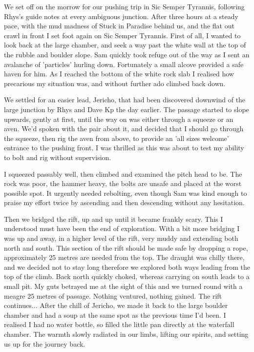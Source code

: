 We set off on the morrow for our pushing trip in Sic Semper Tyrannis, following Rhys's guide notes at every ambiguous junction. After three hours at a steady pace, with the mud madness of Stuck in Paradise behind us, and the flat out crawl in front I set foot again on Sic Semper Tyrannis.
First of all, I wanted to look back at the large chamber, and seek a way past the white wall at the top of the rubble and boulder slope. Sam quickly took refuge out of the way as I sent an avalanche of 'particles' hurling down. Fortunately a small alcove provided a safe haven for him. As I reached the bottom of the white rock slab I realised how precarious my situation was, and without further ado climbed back down.

We settled for an easier lead, Jericho, that had been discovered downwind of the large junction by Rhys and Dave Kp the day earlier. The passage started to slope upwards, gently at first, until the way on was either through a squeeze or an aven. We'd spoken with the pair about it, and decided that I should go through the squeeze, then rig the aven from above, to provide an 'all sizes welcome' entrance to the pushing front. I was thrilled as this was about to test my ability to bolt and rig without supervision.

I squeezed passably well, then climbed and examined the pitch head to be. The rock was poor, the hammer heavy, the bolts are unsafe and placed at the worst possible spot. It urgently needed rebolting, even though Sam was kind enough to praise my effort twice by ascending and then descending without any hesitation.

Then we bridged the rift, up and up until it became frankly scary. This I understood must have been the end of exploration. With a bit more bridging I was up and away, in a higher level of the rift, very muddy and extending both north and south. This section of the rift should be made safe by dropping a rope, approximately 25 metres are needed from the top. The draught was chilly there, and we decided not to stay long therefore we explored both ways leading from the top of the climb. Back north quickly choked, whereas carrying on south leads to a small pit. My guts betrayed me at the sight of this and we turned round with a meagre 25 metres of passage. Nothing ventured, nothing gained. The rift continues... After the chill of Jericho, we made it back to the large boulder chamber and had a soup at the same spot as the previous time I'd been. I realised I had no water bottle, so filled the little pan directly at the waterfall chamber. The warmth slowly radiated in our limbs, lifting our spirits, and setting us up for the journey back.

